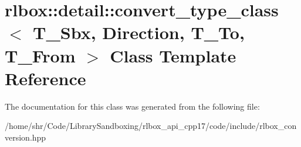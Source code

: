 \hypertarget{classrlbox_1_1detail_1_1convert__type__class}{}\section{rlbox\+:\+:detail\+:\+:convert\+\_\+type\+\_\+class$<$ T\+\_\+\+Sbx, Direction, T\+\_\+\+To, T\+\_\+\+From $>$ Class Template Reference}
\label{classrlbox_1_1detail_1_1convert__type__class}


The documentation for this class was generated from the following file\+:\begin{DoxyCompactItemize}
\item 
/home/shr/\+Code/\+Library\+Sandboxing/rlbox\+\_\+api\+\_\+cpp17/code/include/rlbox\+\_\+conversion.\+hpp\end{DoxyCompactItemize}
